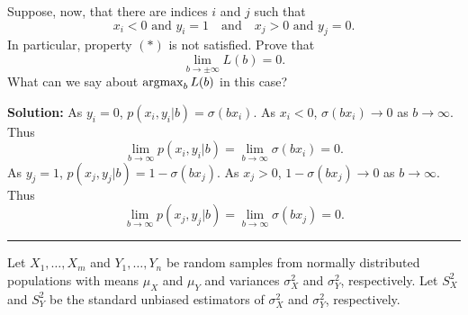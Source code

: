 \documentclass[12pt]{amsart}
\newcommand{\sol}{\bigskip\noindent\textbf{Solution: }}
\begin{document}
Suppose, now, that there are indices $i$ and $j$ such that
\[
    \text{$x_i<0$ and $y_i=1$}\quad\text{and}\quad
    \text{$x_j>0$ and $y_j=0$}.
\]
In particular, property $(*)$ is not satisfied.
Prove that
\[
    \lim_{b\to\pm\infty}L(b) = 0.
\]
What can we say about $\operatorname*{argmax}_b L(b)$ in this case?

\sol
As $y_i=0$, $p(x_i, y_i|b) = \sigma(bx_i)$. As $x_i<0$, $\sigma(bx_i)\to 0$ as $b\to\infty$.
Thus
\[
    \lim_{b\to\infty}p(x_i, y_i|b) =  \lim_{b\to\infty} \sigma(bx_i) = 0.
\]
As $y_j=1$, $p(x_j, y_j|b) = 1-\sigma(bx_j)$. As $x_j>0$, $1-\sigma(bx_j)\to 0$ as $b\to\infty$.
Thus
\[
    \lim_{b\to\infty}p(x_j, y_j|b) =  \lim_{b\to\infty} \sigma(bx_j) = 0.
\]


\bigskip\hrule\bigskip

Let $X_1,\ldots,X_m$ and $Y_1,\ldots,Y_n$ be random samples from normally distributed populations with 
means $\mu_X$ and $\mu_Y$ and variances $\sigma_X^2$ and $\sigma_Y^2$, respectively.
Let $S_X^2$ and $S_Y^2$ be the standard unbiased estimators of $\sigma_X^2$ and $\sigma_Y^2$,
respectively.
\end{document}
